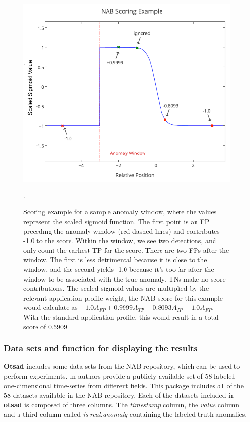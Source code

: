 \documentclass[a4paper]{article}\usepackage[]{graphicx}\usepackage[]{color}
\begin{document}
\begin{figure}[htbp]
\centering
\includegraphics[width=0.7\linewidth]{ScoreExample.PNG}
\caption{Scoring example for a sample anomaly window, where the values represent the scaled sigmoid function. The first point is an FP preceding the anomaly window (red dashed lines) and contributes -1.0 to the score. Within the window, we see two detections, and only count the earliest TP for the score. There are two FPs after the window. The first is less detrimental because it is close to the window, and the second yields -1.0 because it's too far after the window to be associated with the true anomaly. TNs make no score contributions. The scaled sigmoid values are multiplied by the relevant application profile weight, the NAB score for this example would calculate as \( -1.0 A_{FP} + 0.9999 A_{TP} - 0.8093 A_{FP} - 1.0 A_{FP}\). With the standard application profile, this would result in a total score of 0.6909 \cite{7424283}}.
\label{fig:ScoringEx}
\end{figure}

\subsubsection{Data sets and function for displaying the results} \label{S:3.1.3}

\textbf{Otsad} includes some data sets from the NAB repository, which can be used to perform experiments. In \cite{7424283} authors provide a publicly available set of 58 labeled one-dimensional time-series from different fields. This package includes 51 of the 58 datasets available in the NAB repository. Each of the datasets included in \textbf{otsad} is composed of three columns.  The \emph{timestamp} column, the \emph{value} column and a third column called \emph{is.real.anomaly} containing the labeled truth anomalies.
\end{document}
